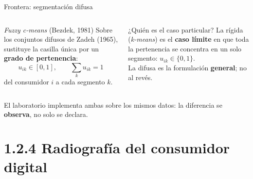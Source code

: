 \documentclass[aspectratio=169,xcolor=dvipsnames]{beamer}
\begin{document}
\begin{frame}{Frontera: segmentación difusa}
\begin{columns}[T]
  \begin{block}{\textit{Fuzzy c-means} (Bezdek, 1981)}
    \small Sobre los conjuntos difusos de Zadeh (1965), sustituye la casilla única por un \textbf{grado de pertenencia}:
    \[
      u_{ik} \in [0,1], \qquad \sum_{k} u_{ik} = 1
    \]
    del consumidor $i$ a cada segmento $k$.
  \end{block}
  \begin{alertblock}{¿Quién es el caso particular?}
    \small La rígida (\textit{k-means}) es el \textbf{caso límite} en que toda la pertenencia se concentra en un solo segmento: $u_{ik}\in\{0,1\}$.\\[4pt]
    La difusa es la formulación \textbf{general}; no al revés.
  \end{alertblock}
\end{columns}
\vspace{6pt}
\begin{center}\small El laboratorio implementa ambas sobre los mismos datos: la diferencia se \textbf{observa}, no solo se declara.\end{center}
\end{frame}

\section[Radiografía]{1.2.4 Radiografía del consumidor digital}
\end{document}
